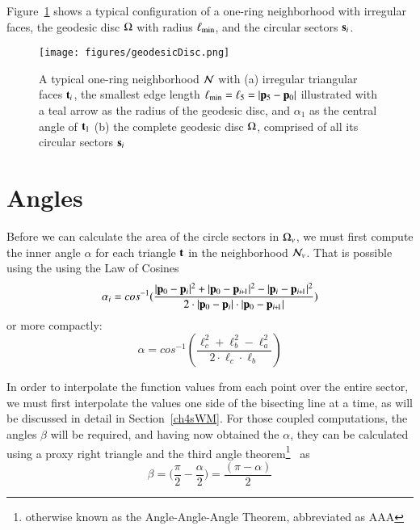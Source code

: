 Figure~\ref{fig:geodesicDisc} shows a typical configuration of a one-ring neighborhood with irregular faces, the geodesic disc $\Omega$ with radius $\ell_\text{min}$, and the circular sectors $\mathbf{s}_i$.

\begin{figure}[ht]
\ffigbox
	{\texttt{[image: figures/geodesicDisc.png]}}
	{\caption[One-ring and geodesic disc]{A typical one-ring neighborhood $\mathcal{N}$ with (a) irregular triangular faces $\mathbf{t}_i$, the smallest edge length $\ell_\text{min} = \ell_5 = |\mathbf{p}_5 - \mathbf{p}_0|$ illustrated with a teal arrow as the radius of the geodesic disc, and $\alpha_1$ as the central angle of $\mathbf{t}_1$ (b) the complete geodesic disc $\Omega$, comprised of all its circular sectors $\mathbf{s}_i$}\label{fig:geodesicDisc}}
\end{figure}%

%
%
%
%
\section{Angles}
\label{ch4sIA}
Before we can calculate the area of the circle sectors in $\Omega_v$, we must first compute the inner angle $\alpha$ for each triangle $\mathbf{t}$ in the neighborhood $\mathcal{N}_v$. That is possible using the using the Law of Cosines~\cite{Weisstein19e}
%
\begin{equation}
	\alpha_i = cos^{-1}(\frac{|\bp_0 - \bp_{i}|^2 + |\bp_0 - \bp_{\sipo}|^2 - |\bp_i - \bp_{\sipo}|^2}{2\cdot|\bp_0 - \bp_{i}|\cdot|\bp_0 - \bp_{\sipo}|})
\end{equation}
%
or more compactly:
%
\begin{equation}
	\alpha = cos^{-1}\left (\frac{\ell_c^2 + \ell_b^2 - \ell_a^2}{2\cdot\ell_c\cdot\ell_b}\right )
	\label{eq:alphaFromEdgeLengths}
\end{equation}%
%

In order to interpolate the function values from each point over the entire sector, we must first interpolate the values one side of the bisecting line at a time, as will be discussed in detail in Section~\ref{ch4sWM}. For those coupled computations, the angles $\beta$ will be required, and having now obtained the $\alpha$, they can be calculated using a proxy right triangle and the third angle theorem\footnote{otherwise known as the Angle-Angle-Angle Theorem, abbreviated as AAA}~\cite{Weisstein19f} as
%
\begin{equation}
	\beta = \Big(\frac{\pi}{2} - \frac{\alpha}{2}\Big) = \frac{(\pi - \alpha)}{2}
	\label{eq:betaFromHalfAlpha}
\end{equation}%
%

